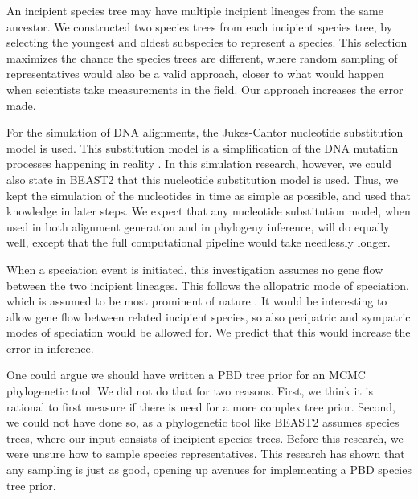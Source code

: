 
An incipient species tree may have multiple incipient lineages from the
same ancestor. We constructed two species trees from each incipient species
tree, by selecting the youngest and oldest subspecies to represent a species.
This selection maximizes the chance the species trees are different, where
random sampling of representatives would also be a valid approach, closer
to what would happen when scientists take measurements in the field. Our
approach increases the error made.


For the simulation of DNA alignments, the Jukes-Cantor nucleotide substitution model
is used. This substitution model is a simplification of the DNA mutation processes
happening in reality . In this simulation research, however, we could also
state in BEAST2 that this nucleotide substitution model is used. Thus, we kept
the simulation of the nucleotides in time as simple as possible, and used that
knowledge in later steps. We expect that any nucleotide substitution model, when
used in both alignment generation and in phylogeny inference, will do equally well,
except that the full computational pipeline would take needlessly longer.


When a speciation event is initiated, this investigation assumes no gene flow
between the two incipient lineages. This follows the allopatric mode of speciation, 
which is assumed to be most prominent of nature . It would be interesting to
allow gene flow between related incipient species, 
so also peripatric and sympatric modes of speciation would be allowed for.
We predict that this would increase the error in inference.

One could argue we should have written a PBD tree prior for an MCMC phylogenetic tool.
We did not do that for two reasons. First, we think it is rational to first
measure if there is need for a more complex tree prior. Second, 
we could not have done so, as a phylogenetic tool like BEAST2 assumes species
trees, where our input consists of incipient species trees. Before this
research, we were unsure how to sample species representatives. This research
has shown that any sampling is just as good, opening up avenues for
implementing a PBD species tree prior.


